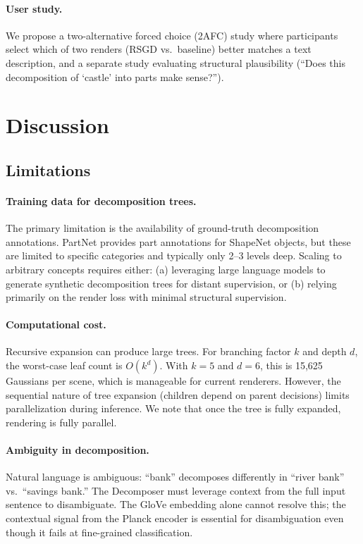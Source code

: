 \documentclass[11pt]{article}
\begin{document}
\paragraph{User study.} We propose a two-alternative forced choice (2AFC) study where participants select which of two renders (RSGD vs.\ baseline) better matches a text description, and a separate study evaluating structural plausibility (``Does this decomposition of `castle' into parts make sense?'').

\section{Discussion}

\subsection{Limitations}

\paragraph{Training data for decomposition trees.} The primary limitation is the availability of ground-truth decomposition annotations. PartNet \cite{mo2019} provides part annotations for ShapeNet objects, but these are limited to specific categories and typically only 2--3 levels deep. Scaling to arbitrary concepts requires either: (a) leveraging large language models to generate synthetic decomposition trees for distant supervision, or (b) relying primarily on the render loss with minimal structural supervision.

\paragraph{Computational cost.} Recursive expansion can produce large trees. For branching factor $k$ and depth $d$, the worst-case leaf count is $O(k^d)$. With $k=5$ and $d=6$, this is 15,625 Gaussians per scene, which is manageable for current renderers. However, the sequential nature of tree expansion (children depend on parent decisions) limits parallelization during inference. We note that once the tree is fully expanded, rendering is fully parallel.

\paragraph{Ambiguity in decomposition.} Natural language is ambiguous: ``bank'' decomposes differently in ``river bank'' vs.\ ``savings bank.'' The Decomposer must leverage context from the full input sentence to disambiguate. The GloVe embedding alone cannot resolve this; the contextual signal from the Planck encoder is essential for disambiguation even though it fails at fine-grained classification.
\end{document}
